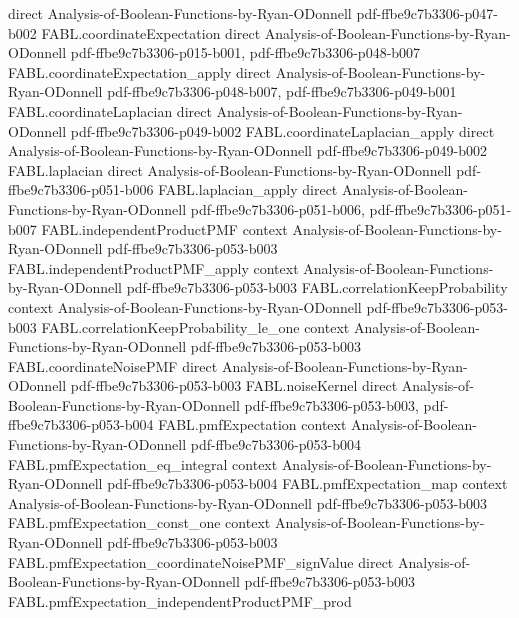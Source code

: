 \begin{theorem}
  {direct}
  {Analysis-of-Boolean-Functions-by-Ryan-ODonnell}
  {pdf-ffbe9c7b3306-p047-b002}
\proofstep
  {FABL.coordinateExpectation}
  {direct}
  {Analysis-of-Boolean-Functions-by-Ryan-ODonnell}
  {pdf-ffbe9c7b3306-p015-b001,
    pdf-ffbe9c7b3306-p048-b007}
\proofstep
  {FABL.coordinateExpectation_apply}
  {direct}
  {Analysis-of-Boolean-Functions-by-Ryan-ODonnell}
  {pdf-ffbe9c7b3306-p048-b007,
    pdf-ffbe9c7b3306-p049-b001}
\proofstep
  {FABL.coordinateLaplacian}
  {direct}
  {Analysis-of-Boolean-Functions-by-Ryan-ODonnell}
  {pdf-ffbe9c7b3306-p049-b002}
\proofstep
  {FABL.coordinateLaplacian_apply}
  {direct}
  {Analysis-of-Boolean-Functions-by-Ryan-ODonnell}
  {pdf-ffbe9c7b3306-p049-b002}
\proofstep
  {FABL.laplacian}
  {direct}
  {Analysis-of-Boolean-Functions-by-Ryan-ODonnell}
  {pdf-ffbe9c7b3306-p051-b006}
\proofstep
  {FABL.laplacian_apply}
  {direct}
  {Analysis-of-Boolean-Functions-by-Ryan-ODonnell}
  {pdf-ffbe9c7b3306-p051-b006,
    pdf-ffbe9c7b3306-p051-b007}
\proofstep
  {FABL.independentProductPMF}
  {context}
  {Analysis-of-Boolean-Functions-by-Ryan-ODonnell}
  {pdf-ffbe9c7b3306-p053-b003}
\proofstep
  {FABL.independentProductPMF_apply}
  {context}
  {Analysis-of-Boolean-Functions-by-Ryan-ODonnell}
  {pdf-ffbe9c7b3306-p053-b003}
\proofstep
  {FABL.correlationKeepProbability}
  {context}
  {Analysis-of-Boolean-Functions-by-Ryan-ODonnell}
  {pdf-ffbe9c7b3306-p053-b003}
\proofstep
  {FABL.correlationKeepProbability_le_one}
  {context}
  {Analysis-of-Boolean-Functions-by-Ryan-ODonnell}
  {pdf-ffbe9c7b3306-p053-b003}
\proofstep
  {FABL.coordinateNoisePMF}
  {direct}
  {Analysis-of-Boolean-Functions-by-Ryan-ODonnell}
  {pdf-ffbe9c7b3306-p053-b003}
\proofstep
  {FABL.noiseKernel}
  {direct}
  {Analysis-of-Boolean-Functions-by-Ryan-ODonnell}
  {pdf-ffbe9c7b3306-p053-b003,
    pdf-ffbe9c7b3306-p053-b004}
\proofstep
  {FABL.pmfExpectation}
  {context}
  {Analysis-of-Boolean-Functions-by-Ryan-ODonnell}
  {pdf-ffbe9c7b3306-p053-b004}
\proofstep
  {FABL.pmfExpectation_eq_integral}
  {context}
  {Analysis-of-Boolean-Functions-by-Ryan-ODonnell}
  {pdf-ffbe9c7b3306-p053-b004}
\proofstep
  {FABL.pmfExpectation_map}
  {context}
  {Analysis-of-Boolean-Functions-by-Ryan-ODonnell}
  {pdf-ffbe9c7b3306-p053-b003}
\proofstep
  {FABL.pmfExpectation_const_one}
  {context}
  {Analysis-of-Boolean-Functions-by-Ryan-ODonnell}
  {pdf-ffbe9c7b3306-p053-b003}
\proofstep
  {FABL.pmfExpectation_coordinateNoisePMF_signValue}
  {direct}
  {Analysis-of-Boolean-Functions-by-Ryan-ODonnell}
  {pdf-ffbe9c7b3306-p053-b003}
\proofstep
  {FABL.pmfExpectation_independentProductPMF_prod}

\end{theorem}
